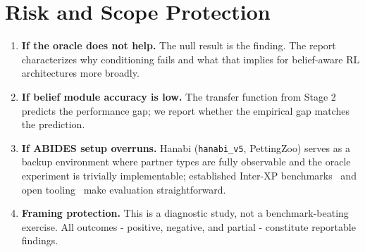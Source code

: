 \documentclass[8pt, a4paper]{article}
\begin{document}
{%

\section{Risk and Scope Protection}

\begin{enumerate}[leftmargin=*, label=\textbf{\arabic*.}]
    \item \textbf{If the oracle does not help.} The null result is the finding. The report characterizes why conditioning fails and what that implies for belief-aware RL architectures more broadly.
    \item \textbf{If belief module accuracy is low.} The transfer function from Stage 2 predicts the performance gap; we report whether the empirical gap matches the prediction.
    \item \textbf{If ABIDES setup overruns.} Hanabi (\texttt{hanabi\_v5}, PettingZoo) serves as a backup environment where partner types are fully observable and the oracle experiment is trivially implementable; established Inter-XP benchmarks~\cite{anyplay2022, charakorn2024diversity} and open tooling~\cite{zsceval2024} make evaluation straightforward.
    \item \textbf{Framing protection.} This is a diagnostic study, not a benchmark-beating exercise. All outcomes - positive, negative, and partial - constitute reportable findings.
\end{enumerate}

}
\end{document}
